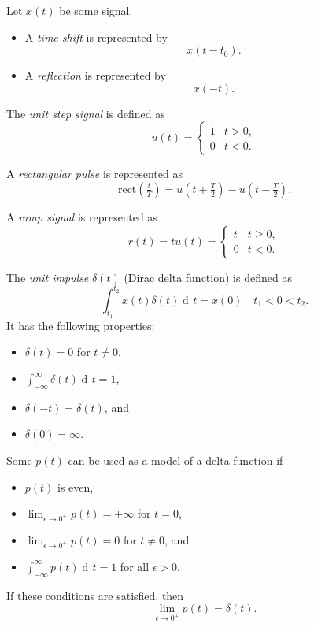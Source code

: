 \documentclass[10pt,letterpaper]{article}
\DeclareMathOperator{\di}{d\!} %
\newcommand{\bracks}[1]{ \left( #1 \right) } %
\newcommand{\tpfrac}[2]{\left(\tfrac{#1}{#2}\right)} %
\newcommand{\rect}{ \text{rect} }
\newcommand{\impulse}{ \delta(t) }
\newcommand{\Iint}{ \int_{-\infty}^{\infty} }
\newcommand{\tint}{ \int_{t_1}^{t_2} }
\begin{document}
\begin{multicols*}{3}
Let $x(t)$ be some signal.
\begin{itemize}[leftmargin=0.5cm]
\item A \textit{time shift} is represented by
\[ x(t-t_0). \]

\item A \textit{reflection} is represented by
\[ x(-t). \]


\end{itemize}

The \textit{unit step signal} is defined as
\[ u(t) = \begin{cases} 
      		1 & t > 0, \\
      		0 & t < 0. 
   		\end{cases}
\]

A \textit{rectangular pulse} is represented as
\[ \rect\tpfrac{t}{T} = u\bracks{t + \tfrac{T}{2}} - u\bracks{t - \tfrac{T}{2}}. \]

A \textit{ramp signal} is represented as
\[ r(t) = tu(t) = \begin{cases} 
		      		t & t \geq 0, \\
		      		0 & t < 0. 
		   		\end{cases}
\]

The \textit{unit impulse} $\impulse$ (Dirac delta function) is defined as
\[ \tint x(t) \impulse \di t = x(0) \quad t_1 < 0 < t_2. \]
It has the following properties:
\begin{itemize}[leftmargin=0.5cm]
\item $\impulse = 0$ for $t \neq 0$,
\item $\displaystyle \Iint \impulse \di t = 1$,
\item $\delta(-t) = \impulse$, and
\item $\delta(0) = \infty$.
\end{itemize}

Some $p(t)$ can be used as a model of a delta function if
\begin{itemize}[leftmargin=0.5cm]
\item $p(t)$ is even,
\item $\displaystyle \lim_{\epsilon \rightarrow 0^+} p(t) = +\infty$ for $t = 0$,
\item $\displaystyle \lim_{\epsilon \rightarrow 0^+} p(t) = 0$ for $t \neq 0$, and
\item $\displaystyle \Iint p(t) \di t = 1$ for all $\epsilon > 0$.
\end{itemize}
If these conditions are satisfied, then
\[ \lim_{\epsilon \rightarrow 0^+} p(t) = \impulse. \]


\end{multicols*}
\end{document}

